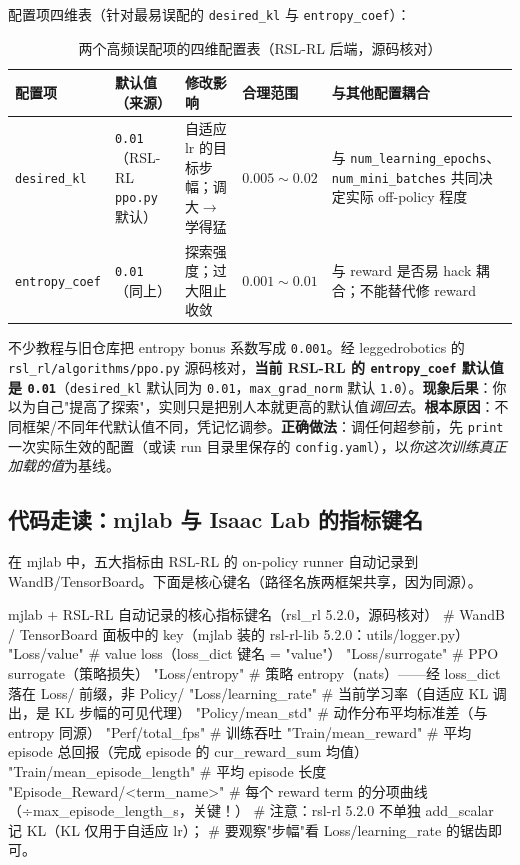 配置项四维表（针对最易误配的 \verb|desired_kl| 与 \verb|entropy_coef|）：

\begin{table}[H]
\centering
\caption{两个高频误配项的四维配置表（RSL-RL 后端，源码核对）}
\label{tab:rlmc-diag-config4}
\begin{tabular}{p{2.2cm}p{2.4cm}p{3.0cm}p{2.4cm}p{2.6cm}}
\hline
配置项 & 默认值（来源） & 修改影响 & 合理范围 & 与其他配置耦合 \\
\hline
\verb|desired_kl| & \verb|0.01|（RSL-RL \verb|ppo.py| 默认） & 自适应 lr 的目标步幅；调大$\to$学得猛 & $0.005\sim0.02$ & 与 \verb|num_learning_epochs|、\verb|num_mini_batches| 共同决定实际 off-policy 程度 \\
\verb|entropy_coef| & \verb|0.01|（同上） & 探索强度；过大阻止收敛 & $0.001\sim0.01$ & 与 reward 是否易 hack 耦合；不能替代修 reward \\
\hline
\end{tabular}
\end{table}

\begin{pitfall}
不少教程与旧仓库把 entropy bonus 系数写成 \verb|0.001|。经 leggedrobotics 的 \verb|rsl_rl/algorithms/ppo.py| 源码核对，\textbf{当前 RSL-RL 的 \texttt{entropy\_coef} 默认值是 \texttt{0.01}}（\verb|desired_kl| 默认同为 \verb|0.01|，\verb|max_grad_norm| 默认 \verb|1.0|）\cite{schwarke2025rslrl}。\textbf{现象后果}：你以为自己"提高了探索"，实则只是把别人本就更高的默认值\emph{调回去}。\textbf{根本原因}：不同框架/不同年代默认值不同，凭记忆调参。\textbf{正确做法}：调任何超参前，先 \verb|print| 一次实际生效的配置（或读 run 目录里保存的 \verb|config.yaml|），以\emph{你这次训练真正加载的值}为基线。
\end{pitfall}

\subsection{代码走读：mjlab 与 Isaac Lab 的指标键名}

在 mjlab 中，五大指标由 RSL-RL 的 on-policy runner 自动记录到 WandB/TensorBoard。下面是核心键名（路径名族两框架共享，因为同源）。

\begin{codebox}[Python]{mjlab + RSL-RL 自动记录的核心指标键名（rsl\_rl 5.2.0，源码核对）}
# WandB / TensorBoard 面板中的 key（mjlab 装的 rsl-rl-lib 5.2.0：utils/logger.py）
"Loss/value"                 # value loss（loss_dict 键名 = "value"）
"Loss/surrogate"             # PPO surrogate（策略损失）
"Loss/entropy"              # 策略 entropy（nats）——经 loss_dict 落在 Loss/ 前缀，非 Policy/
"Loss/learning_rate"         # 当前学习率（自适应 KL 调出，是 KL 步幅的可见代理）
"Policy/mean_std"            # 动作分布平均标准差（与 entropy 同源）
"Perf/total_fps"             # 训练吞吐
"Train/mean_reward"          # 平均 episode 总回报（完成 episode 的 cur_reward_sum 均值）
"Train/mean_episode_length"  # 平均 episode 长度
"Episode_Reward/<term_name>" # 每个 reward term 的分项曲线（÷max_episode_length_s，关键！）
# 注意：rsl-rl 5.2.0 不单独 add_scalar 记 KL（KL 仅用于自适应 lr）；
#       要观察"步幅"看 Loss/learning_rate 的锯齿即可。
\end{codebox}

